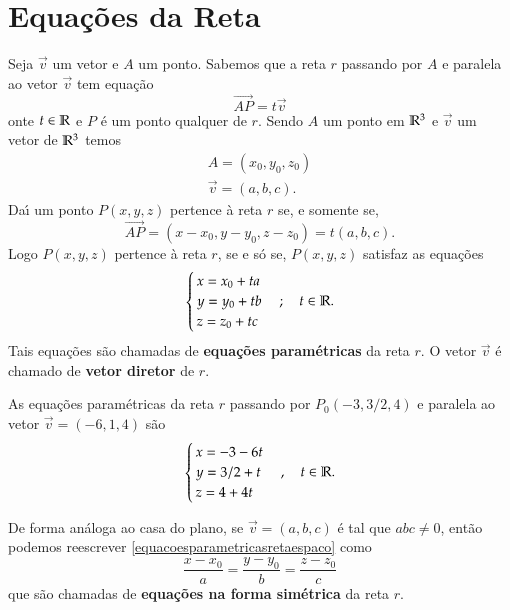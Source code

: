 
\section{Equa\c{c}\~oes da Reta} %
\label{sec:equacoes_da_reta}

Seja $\vec{v}$ um vetor e $A$ um ponto. Sabemos que a reta $r$ passando por $A$ e paralela ao vetor $\vec{v}$ tem equa\c{c}\~ao
\begin{equation}
    \vec{AP} = t\vec{v}
\end{equation}
onte $t \in \mathbb{R}$ e $P$ \'e um ponto qualquer de $r$. Sendo $A$ um ponto em $\mathbb{R}^3$ e $\vec{v}$ um vetor de $\mathbb{R}^3$ temos
\begin{align*}
    A = (x_0, y_0, z_0)\\
    \vec{v} = (a, b, c).
\end{align*}
Da{\'\i} um ponto $P(x, y, z)$ pertence \`a reta $r$ se, e somente se,
\[
    \vec{AP} = (x - x_0, y - y_0, z - z_0) = t(a, b, c).
\]
Logo $P(x, y, z)$ pertence \`a reta $r$, se e s\'o se, $P(x,y,z)$ satisfaz as equa\c{c}\~oes
\begin{equation}\label{equacoesparametricasretaespaco}
    \begin{cases}
        x = x_0 + ta\\
        y = y_0 + tb\\
        z = z_0 + tc
    \end{cases}; \quad t \in \mathbb{R}.
\end{equation}
Tais equa\c{c}\~oes s\~ao chamadas de \textbf{equa\c{c}\~oes param\'etricas} da reta $r$. O vetor $\vec{v}$ \'e chamado de \textbf{vetor diretor} de $r$.

\begin{exemplo}
    As equa\c{c}\~oes param\'etricas da reta $r$ passando por $P_0(-3,3/2,4)$ e paralela ao vetor $\vec{v} = (-6,1,4)$ s\~ao
    \[
        \begin{cases}
            x = -3 - 6t\\
            y = 3/2 + t\\
            z = 4 + 4t
        \end{cases},\quad t \in \mathbb{R}.
    \]
\end{exemplo}

De forma an\'aloga ao casa do plano, se $\vec{v} = (a,b,c)$ \'e tal que $abc \ne 0$, ent\~ao podemos reescrever \eqref{equacoesparametricasretaespaco} como
\[
    \dfrac{x - x_0}{a} = \dfrac{y - y_0}{b} = \dfrac{z - z_0}{c}
\]
que s\~ao chamadas de \textbf{equa\c{c}\~oes na forma sim\'etrica} da reta $r$.
